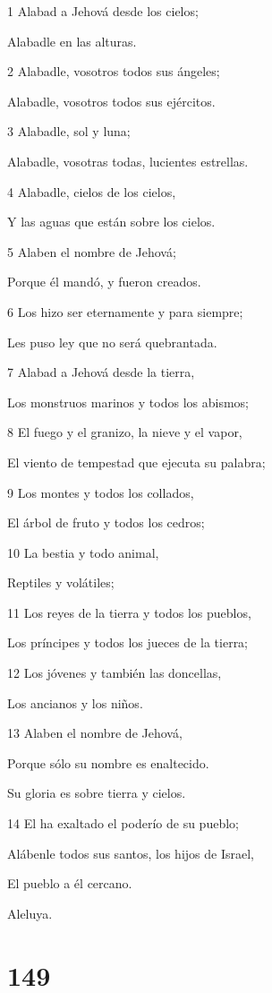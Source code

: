 \par 1 Alabad a Jehová desde los cielos;
\par Alabadle en las alturas.
\par 2 Alabadle, vosotros todos sus ángeles;
\par Alabadle, vosotros todos sus ejércitos.
\par 3 Alabadle, sol y luna;
\par Alabadle, vosotras todas, lucientes estrellas.
\par 4 Alabadle, cielos de los cielos,
\par Y las aguas que están sobre los cielos.
\par 5 Alaben el nombre de Jehová;
\par Porque él mandó, y fueron creados.
\par 6 Los hizo ser eternamente y para siempre;
\par Les puso ley que no será quebrantada.
\par 7 Alabad a Jehová desde la tierra,
\par Los monstruos marinos y todos los abismos;
\par 8 El fuego y el granizo, la nieve y el vapor,
\par El viento de tempestad que ejecuta su palabra;
\par 9 Los montes y todos los collados,
\par El árbol de fruto y todos los cedros;
\par 10 La bestia y todo animal,
\par Reptiles y volátiles;
\par 11 Los reyes de la tierra y todos los pueblos,
\par Los príncipes y todos los jueces de la tierra;
\par 12 Los jóvenes y también las doncellas,
\par Los ancianos y los niños.
\par 13 Alaben el nombre de Jehová,
\par Porque sólo su nombre es enaltecido.
\par Su gloria es sobre tierra y cielos.
\par 14 El ha exaltado el poderío de su pueblo;
\par Alábenle todos sus santos, los hijos de Israel,
\par El pueblo a él cercano.
\par Aleluya.

\chapter{149}


